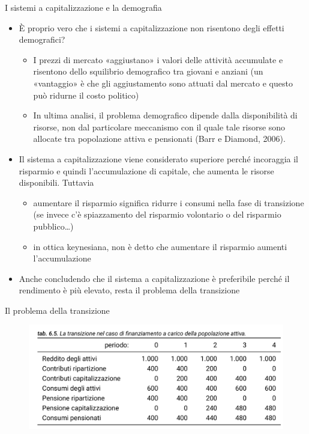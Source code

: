 \documentclass[aspectratio=64,11pt]{beamer}
\begin{document}
\begin{frame}{I sistemi a capitalizzazione e la demografia}
\begin{itemize}
\item È proprio vero che i sistemi a capitalizzazione non risentono degli effetti
demografici?
\begin{itemize}
\item I prezzi di mercato «aggiustano» i valori delle attività accumulate e
risentono dello squilibrio demografico tra giovani e anziani (un
«vantaggio» è che gli aggiustamento sono attuati dal mercato e questo può
ridurne il costo politico)
\item In ultima analisi, il problema demografico dipende dalla disponibilità di
risorse, non dal particolare meccanismo con il quale tale risorse sono
allocate tra popolazione attiva e pensionati (Barr e Diamond, 2006).
\end{itemize}
\item Il sistema a capitalizzazione viene considerato superiore perché incoraggia
il risparmio e quindi l'accumulazione di capitale, che aumenta le risorse
disponibili. Tuttavia
\begin{itemize}
\item aumentare il risparmio significa ridurre i consumi nella fase di
transizione (se invece c'è spiazzamento del risparmio volontario o del
risparmio pubblico\ldots{})
\item in ottica keynesiana, non è detto che aumentare il risparmio aumenti
l'accumulazione
\end{itemize}
\item Anche concludendo che il sistema a capitalizzazione è preferibile perché il
rendimento è più elevato, resta il problema della \alert{transizione}
\end{itemize}
\end{frame}

\begin{frame}{Il problema della transizione}
\begin{figure}[htbp]
\centering
\includegraphics[width=\textwidth]{./figure/transizione-alla-capitalizzazione-1.png}
\end{figure}
\end{frame}
\end{document}
